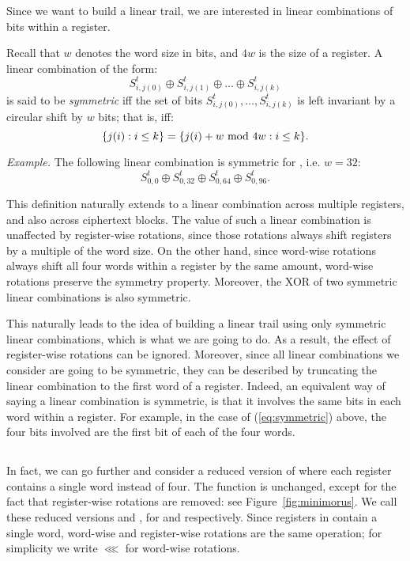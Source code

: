 \documentclass{llncs}
\begin{document}
Since we want to build a linear trail, we are interested in linear combinations of bits within a register.
\begin{definition}
Recall that $w$ denotes the word size in bits, and $4w$ is the size of a register. A linear combination of the form:
\[
S^t_{i,j(0)} \oplus S^t_{i,j(1)} \oplus \dots \oplus S^t_{i,j(k)}
\]
is said to be \emph{symmetric} iff the set of bits $S^t_{i,j(0)}, \dots, S^t_{i,j(k)}$ is left invariant by a circular shift by $w$ bits; that is, iff:
\[
\{j(i) : i\leq k\} = \{j(i) + w \text{\rm{} mod } 4w : i\leq k\}.
\]
\end{definition}
\emph{Example.} The following linear combination is symmetric for , i.e. $w = 32$:
\begin{equation}
S^t_{0,0} \oplus S^t_{0,32} \oplus S^t_{0,64} \oplus S^t_{0,96}.
\label{eq:symmetric}
\end{equation}

This definition naturally extends to a linear combination across multiple registers, and also across ciphertext blocks.
The value of such a linear combination is unaffected by register-wise rotations, since those rotations always shift registers by a multiple of the word size.
On the other hand, since word-wise rotations always shift all four words within a register by the same amount, word-wise rotations preserve the symmetry property. Moreover, the XOR of two symmetric linear combinations is also symmetric.%

This naturally leads to the idea of building a linear trail using only symmetric linear combinations, which is what we are going to do. As a result, the effect of register-wise rotations can be ignored. Moreover, since all linear combinations we consider are going to be symmetric, they can be described by truncating the linear combination to the first word of a register. Indeed, an equivalent way of saying a linear combination is symmetric, is that it involves the same bits in each word within a register. For example, in the case of (\ref{eq:symmetric}) above, the four bits involved are the first bit of each of the four words.

\subsection{}

In fact, we can go further and consider a reduced version of  where each register contains a single word instead of four. The \StateUpdate{} function is unchanged, except for the fact that register-wise rotations are removed: see Figure~\ref{fig:minimorus}. We call these reduced versions  and , for  and  respectively. Since registers in  contain a single word, word-wise and register-wise rotations are the same operation; for simplicity we write $\lll$ for word-wise rotations.
\end{document}
